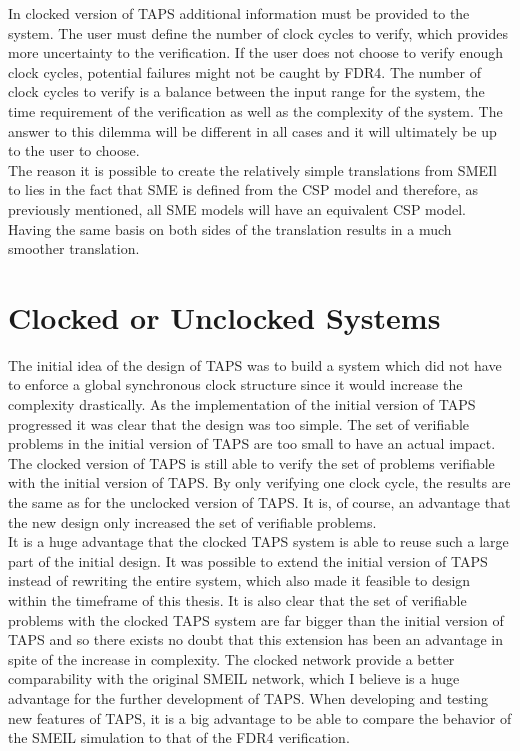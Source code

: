 In clocked version of TAPS additional information must be provided to the system. The user must define the number of clock cycles to verify, which provides more uncertainty to the verification. If the user does not choose to verify enough clock cycles, potential failures might not be caught by FDR4. The number of clock cycles to verify is a balance between the input range for the system, the time requirement of the verification as well as the complexity of the system.
The answer to this dilemma will be different in all cases and it will ultimately be up to the user to choose. \\

The reason it is possible to create the relatively simple translations from SMEIl to \cspm{} lies in the fact that SME is defined from the CSP model and therefore, as previously mentioned, all SME models will have an equivalent CSP model. Having the same basis on both sides of the translation results in a much smoother translation.

\section{Clocked or Unclocked \cspm{} Systems}
The initial idea of the design of TAPS was to build a system which did not have to enforce a global synchronous clock structure since it would increase the complexity drastically. As the implementation of the initial version of TAPS progressed it was clear that the design was too simple. The set of verifiable problems in the initial version of TAPS are too small to have an actual impact.
The clocked version of TAPS is still able to verify the set of problems verifiable with the initial version of TAPS. By only verifying one clock cycle, the results are the same as for the unclocked version of TAPS. It is, of course, an advantage that the new design only increased the set of verifiable problems. \\

It is a huge advantage that the clocked TAPS system is able to reuse such a large part of the initial design. It was possible to extend the initial version of TAPS instead of rewriting the entire system, which also made it feasible to design within the timeframe of this thesis.
It is also clear that the set of verifiable problems with the clocked TAPS system are far bigger than the initial version of TAPS and so there exists no doubt that this extension has been an advantage in spite of the increase in complexity.
The clocked \cspm{} network provide a better comparability with the original SMEIL network, which I believe is a huge advantage for the further development of TAPS. When developing and testing new features of TAPS, it is a big advantage to be able to compare the behavior of the SMEIL simulation to that of the FDR4 verification. \\

